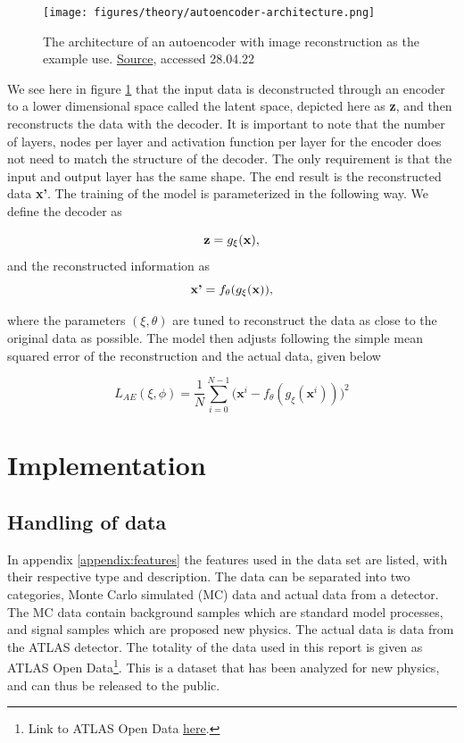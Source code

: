 \documentclass[ reprint, amsmath,amssymb, aps, nofootinbib]{revtex4-2}
\begin{document}
\begin{figure}[H]
    \centering
    \texttt{[image: figures/theory/autoencoder-architecture.png]}
    \caption{The architecture of an autoencoder with image reconstruction as the example use. \href{https://lilianweng.github.io/posts/2018-08-12-vae/}{Source}, accessed 28.04.22}
    \label{fig:auto_en_archi}
\end{figure}

We see here in figure \ref{fig:auto_en_archi} that the input data is deconstructed through an encoder to a lower dimensional space called the latent space, depicted here as \textbf{z}, and then reconstructs the data with the decoder. It is important to note that the number of layers, nodes per layer and activation function per layer for the encoder does not need to match the structure of the decoder. The only requirement is that the input and output layer has the same shape. The end result is the reconstructed data \textbf{x'}. The training of the model is parameterized in the following way. We define the decoder as 

\begin{equation*}
    \textbf{z} = g_{\xi}(\bf{x}),
\end{equation*}
and the reconstructed information as 
\begin{equation*}
    \textbf{x'} = f_{\theta}(g_{\xi}(\bf{x})),
\end{equation*}

where the parameters $(\xi, \theta)$ are tuned to reconstruct the data as close to the original data as possible. The model then adjusts following the simple mean squared error of the reconstruction and the actual data, given below

\begin{equation*}
    L_{AE}(\xi, \phi)= \frac{1}{N} \sum_{i=0}^{N-1}\bigg( \textbf{x}^i - f_{\theta}(g_{\xi}(\textbf{x}^i))\bigg)^2
\end{equation*}



\section{Implementation}

\subsection{Handling of data}

In appendix \ref{appendix:features} the features used in the data set are listed, with their respective type and description. The data can be separated into two categories, Monte Carlo simulated (MC) data and actual data from a detector. The MC data contain background samples which are standard model processes, and signal samples which are proposed new physics. The actual data is data from the ATLAS detector. The totality of the data used in this report is given as ATLAS Open Data\footnote{Link to ATLAS Open Data \href{https://atlas.cern/resources/opendata}{here}.}. This is a dataset that has been analyzed for new physics, and can thus be released to the public. 
\end{document}
